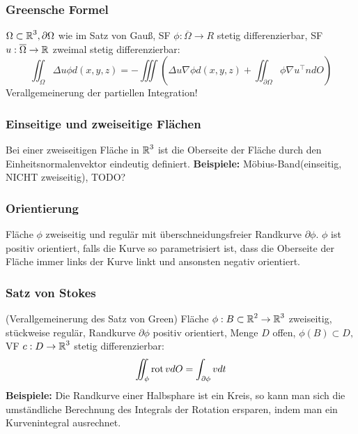 \documentclass[german]{latex4ei/latex4ei_sheet}
\begin{document}
\subsubsection{Greensche Formel}
$\Omega \subset \operatorname{\mathbb R}^3, \partial \Omega$ wie im Satz von Gau\ss{}, SF $\phi: \overline{\Omega} \to R$ stetig differenzierbar, SF $u: \overline{\Omega} \to \operatorname{\mathbb R}$ zweimal stetig differenzierbar:\\
\[\iint_\Omega \Delta u \phi d(x,y,z)=-\iiint(\Delta u \nabla \phi d(x,y,z) + \iint_{\partial \Omega} \phi \nabla u^\top n d O)\]
Verallgemeinerung der partiellen Integration!

\subsubsection{Einseitige und zweiseitige Fl\"achen}
Bei einer zweiseitigen Fl\"ache in $\operatorname{\mathbb R}^3$ ist die Oberseite der Fl\"ache durch den Einheitsnormalenvektor eindeutig definiert.
\textbf{Beispiele:} M\"obius-Band(einseitig, NICHT zweiseitig), TODO?

\subsubsection{Orientierung}
Fl\"ache $\phi$ zweiseitig und regul\"ar mit \"uberschneidungsfreier Randkurve $\partial \phi$. $\phi$ ist positiv orientiert, falls die Kurve so parametrisiert ist, dass die Oberseite der Fl\"ache immer links der Kurve linkt und ansonsten negativ orientiert.

\subsubsection{Satz von Stokes} (Verallgemeinerung des Satz von Green)
Fl\"ache $\phi: B \subset \operatorname{\mathbb R}^2 \to \operatorname{\mathbb R}^3$ zweiseitig, st\"uckweise regul\"ar, Randkurve $\partial \phi$ positiv orientiert, Menge $D$ offen, $\phi(B) \subset D, $VF $c: D \to \operatorname{\mathbb R}^3$ stetig differenzierbar:
\[\iint_\phi \operatorname{rot} v d O=\int_{\partial \phi} v d t\]
\textbf{Beispiele:} Die Randkurve einer Halbsphare ist ein Kreis, so kann man sich die umst\"andliche Berechnung des Integrals der Rotation ersparen, indem man ein Kurvenintegral ausrechnet.




\end{document}
